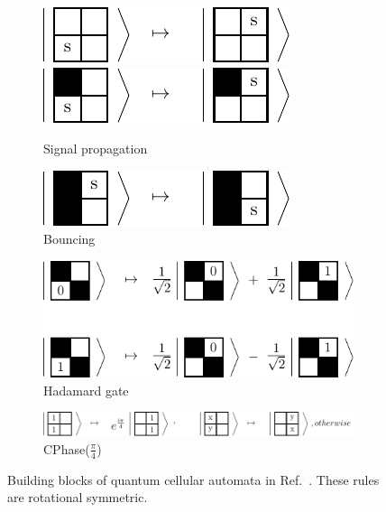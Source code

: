 \documentclass[a4paper]{article}
\newcommand{\<}{\langle}
\renewcommand{\>}{\rangle}
\begin{document}
\begin{figure}[th]
  \begin{subfigure}[b]{\textwidth}
  \centering
  \includegraphics[scale=0.8]{images/bqca-signal.pdf} ~~~~~~~~
  \includegraphics[scale=0.8]{images/bqca-signal1.pdf}
  \caption{Signal propagation}
  \end{subfigure}

  \hfill
  
  \begin{subfigure}[b]{\textwidth}
  \centering
  \includegraphics[scale=0.8]{images/bqca-bouncing.pdf}
  \caption{Bouncing}
  \end{subfigure}

  \hfill

  \centering
  \begin{subfigure}[b]{\textwidth}
  \centering
  \includegraphics[scale=0.8]{images/bqca-hadamard.pdf}
  \caption{Hadamard gate}
  \end{subfigure}
  
  \hfill
  
  \begin{subfigure}[b]{\textwidth}
  \centering
  \includegraphics[scale=0.8]{images/bqca-cphase.pdf}
  \caption{CPhase($\frac{\pi}{4}$)}
  \end{subfigure}
  \caption{Building blocks of quantum cellular automata in Ref.~\cite{Arrighi2012}. These rules are rotational symmetric.}
  \label{fig:qbca}
\end{figure}
\end{document}
